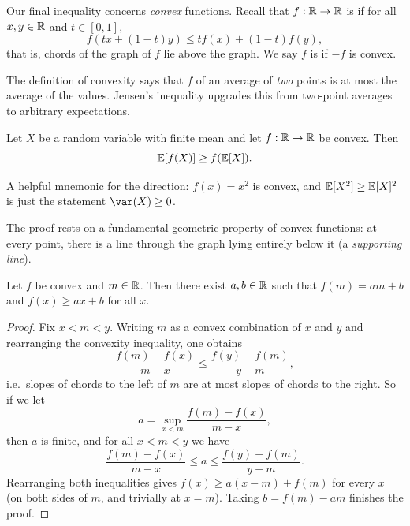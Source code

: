 \documentclass[a4paper]{scrartcl}
\begin{document}
Our final inequality concerns \emph{convex} functions. Recall that $f: \mathbb{R} \rightarrow \mathbb{R}$ is  if for all $x, y \in \mathbb{R}$ and $t \in [0, 1]$,
$$
f(tx + (1 - t)y) \leq tf(x) + (1 - t)f(y),
$$
that is, chords of the graph of $f$ lie above the graph. We say $f$ is  if $-f$ is convex.

\begin{center}
\end{center}

The definition of convexity says that $f$ of an average of \emph{two} points is at most the average of the values. Jensen's inequality upgrades this from two-point averages to arbitrary expectations.

\begin{theorem}
	Let $X$ be a random variable with finite mean and let $f: \mathbb{R} \rightarrow \mathbb{R}$ be convex. Then
	$$
	\mathbb{E}[f(X)] \geq f(\mathbb{E}[X]).
	$$
\end{theorem}

A helpful mnemonic for the direction: $f(x) = x^2$ is convex, and $\mathbb{E}[X^2] \geq \mathbb{E}[X]^2$ is just the statement $\var(X) \geq 0$.

The proof rests on a fundamental geometric property of convex functions: at every point, there is a line through the graph lying entirely below it (a \emph{supporting line}).

\begin{lemma}
	Let $f$ be convex and $m \in \mathbb{R}$. Then there exist $a, b \in \mathbb{R}$ such that $f(m) = am + b$ and $f(x) \geq ax + b$ for all $x$.
\end{lemma}
\begin{proof}
	Fix $x < m < y$. Writing $m$ as a convex combination of $x$ and $y$ and rearranging the convexity inequality, one obtains
	$$
	\frac{f(m) - f(x)}{m - x} \leq \frac{f(y) - f(m)}{y - m},
	$$
	i.e.\ slopes of chords to the left of $m$ are at most slopes of chords to the right. So if we let
	$$
	a = \sup_{x < m} \frac{f(m) - f(x)}{m - x},
	$$
	then $a$ is finite, and for all $x < m < y$ we have
	$$
	\frac{f(m) - f(x)}{m - x} \leq a \leq \frac{f(y) - f(m)}{y - m}.
	$$
	Rearranging both inequalities gives $f(x) \geq a(x - m) + f(m)$ for every $x$ (on both sides of $m$, and trivially at $x = m$). Taking $b = f(m) - am$ finishes the proof.
\end{proof}
\end{document}
